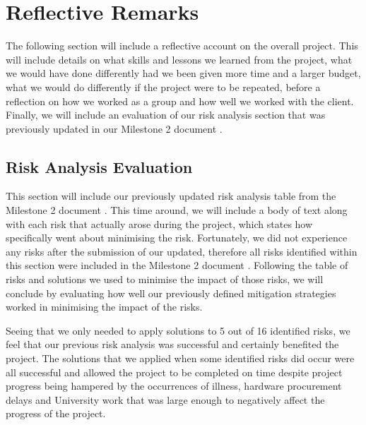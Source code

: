     
    \section{Reflective Remarks}

        The following section will include a reflective account on the overall project. This will include details on what skills and lessons we learned from the project, what we would have done differently had we been given more time and a larger budget, what we would do differently if the project were to be repeated, before a reflection on how we worked as a group and how well we worked with the client. Finally, we will include an evaluation of our risk analysis section that was previously updated in our Milestone 2 document \cite{mile2}.

        \subsection{Risk Analysis Evaluation}
        \label{subsec:risk}

            This section will include our previously updated risk analysis table from the Milestone 2 document \cite{mile2}. This time around, we will include a body of text along with each risk that actually arose during the project, which states how specifically went about minimising the risk. Fortunately, we did not experience any risks after the submission of our updated, therefore all risks identified within this section were included in the Milestone 2 document \cite{mile2}. Following the table of risks and solutions we used to minimise the impact of those risks, we will conclude by evaluating how well our previously defined mitigation strategies worked in minimising the impact of the risks.

            \afterpage{%
                \clearpage%
                \thispagestyle{empty}%
                \begin{landscape}%
                    \centering %
                    
                \end{landscape}
                \clearpage%
            }

            \newpage

            Seeing that we only needed to apply solutions to 5 out of 16 identified risks, we feel that our previous risk analysis was successful and certainly benefited the project. The solutions that we applied when some identified risks did occur were all successful and allowed the project to be completed on time despite project progress being hampered by the occurrences of illness, hardware procurement delays and University work that was large enough to negatively affect the progress of the project. 


